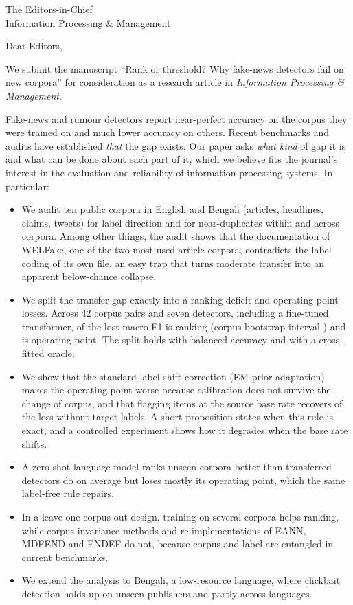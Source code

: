 \documentclass[11pt]{letter}
\begin{document}
\begin{letter}{The Editors-in-Chief\\Information Processing \& Management}
\opening{Dear Editors,}

We submit the manuscript ``Rank or threshold? Why fake-news detectors fail on new corpora'' for consideration as a research article in \emph{Information Processing \& Management}.

Fake-news and rumour detectors report near-perfect accuracy on the corpus they were trained on and much lower accuracy on others. Recent benchmarks and audits have established \emph{that} the gap exists. Our paper asks \emph{what kind} of gap it is and what can be done about each part of it, which we believe fits the journal's interest in the evaluation and reliability of information-processing systems. In particular:

\begin{itemize}
\item We audit ten public corpora in English and Bengali (articles, headlines, claims, tweets) for label direction and for near-duplicates within and across corpora. Among other things, the audit shows that the documentation of WELFake, one of the two most used article corpora, contradicts the label coding of its own file, an easy trap that turns moderate transfer into an apparent below-chance collapse.
\item We split the transfer gap exactly into a ranking deficit and operating-point losses. Across 42 corpus pairs and seven detectors, including a fine-tuned transformer, \RankShareAll{} of the lost macro-F1 is ranking (corpus-bootstrap interval \RankShareCI) and \OpShareAll{} is operating point. The split holds with balanced accuracy and with a cross-fitted oracle.
\item We show that the standard label-shift correction (EM prior adaptation) makes the operating point worse because calibration does not survive the change of corpus, and that flagging items at the source base rate recovers \RecRank{} of the loss without target labels. A short proposition states when this rule is exact, and a controlled experiment shows how it degrades when the base rate shifts.
\item A zero-shot language model ranks unseen corpora better than transferred detectors do on average but loses mostly its operating point, which the same label-free rule repairs.
\item In a leave-one-corpus-out design, training on several corpora helps ranking, while corpus-invariance methods and re-implementations of EANN, MDFEND and ENDEF do not, because corpus and label are entangled in current benchmarks.
\item We extend the analysis to Bengali, a low-resource language, where clickbait detection holds up on unseen publishers and partly across languages.
\end{itemize}


\end{letter}
\end{document}
